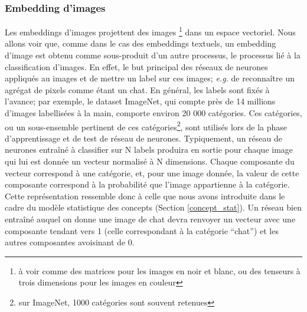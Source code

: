 \documentclass[french]{article}
\begin{document}
			\subsubsection{Embedding d'images}
				Les embeddings d'images projettent des images \footnote{à voir comme des matrices pour les images en noir et blanc, ou des tenseurs à trois dimensions pour les images en couleur} dans un espace vectoriel. Nous allons voir que, comme dans le cas des embeddings textuels, un embedding d'image est obtenu comme sous-produit d'un autre processus, le processus lié à la classification d'images. En effet, le but principal des réseaux de neurones appliqués au images et de mettre un label sur ces images; \textit{e.g.} de reconnaître un agrégat de pixels comme étant un chat. En général, les labels sont fixés à l'avance; par exemple, le dataset ImageNet, qui compte près de 14 millions d'images labellisées à la main, comporte environ 20 000 catégories. Ces catégories, ou un sous-ensemble pertinent de ces catégories\footnote{sur ImageNet, 1000 catégories sont souvent retenues}, sont utilisés lors de la phase d'apprentissage et de test de réseau de neurones. Typiquement, un réseau de neurones entraîné à classifier sur N labels produira en sortie pour chaque image qui lui est donnée un vecteur normalisé à N dimensions. Chaque composante du vecteur correspond à une catégorie, et, pour une image donnée, la valeur de cette composante correspond à la probabilité que l'image appartienne à la catégorie. Cette représentation ressemble donc à celle que nous avons introduite dans le cadre du modèle statistique des concepts (Section \ref*{concept_stat}). Un réseau bien entraîné auquel on donne une image de chat devra renvoyer un vecteur avec une composante tendant vers 1 (celle correspondant à la catégorie ``chat'') et les autres composantes avoisinant de 0.\\
				
\end{document}
